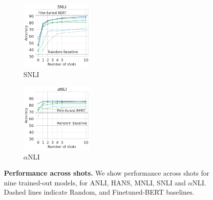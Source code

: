 \begin{figure}[t]
\begin{subfigure}[b]{0.19\textwidth}
    \includegraphics[height=3.45cm, trim=25mm 0 0 0, clip]{figures/snli}
    \caption{SNLI}
    \label{fig:snli}
    \end{subfigure}
    \begin{subfigure}[b]{0.19\textwidth}
    \centering
    \includegraphics[height=3.45cm, trim=25mm 0 0 0, clip]{figures/abductivenli}
    \caption{$\alpha$NLI}
    \label{fig:alphanli}
    \end{subfigure}
    \caption{\textbf{Performance across shots.} We show performance across shots for nine trained-out models, for ANLI, HANS, MNLI, SNLI and $\alpha$NLI. Dashed lines indicate Random, and Finetuned-BERT baselines.}\label{fig:shot_performance}
\end{figure}


